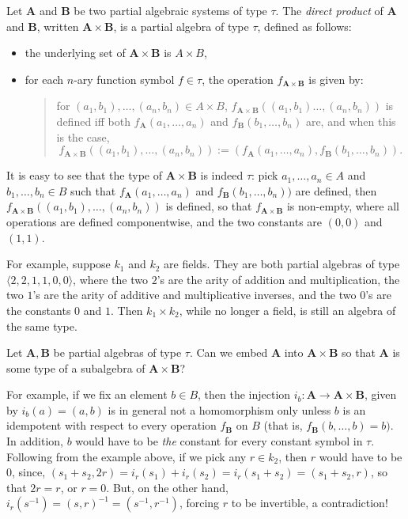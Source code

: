 \documentclass[12pt]{article}
\begin{document}
Let $\boldsymbol{A}$ and $\boldsymbol{B}$ be two partial algebraic systems of type $\tau$.  The \emph{direct product} of $\boldsymbol{A}$ and $\boldsymbol{B}$, written $\boldsymbol{A}\times \boldsymbol{B}$, is a partial algebra of type $\tau$, defined as follows:
\begin{itemize}
\item the underlying set of $\boldsymbol{A}\times \boldsymbol{B}$ is $A\times B$,
\item for each $n$-ary function symbol $f\in \tau$, the operation $f_{\boldsymbol{A}\times \boldsymbol{B}}$ is given by: 
\begin{quote}
for $(a_1,b_1), \ldots, (a_n,b_n) \in A\times B$, $f_{\boldsymbol{A}\times \boldsymbol{B}}((a_1,b_1) \ldots, (a_n,b_n))$  is defined iff both $f_{\boldsymbol{A}}(a_1, \ldots, a_n)$ and $f_{\boldsymbol{B}}(b_1, \ldots,b_n)$ are, and when this is the case,
$$f_{\boldsymbol{A}\times \boldsymbol{B}}((a_1,b_1), \ldots, (a_n,b_n)):=(f_{\boldsymbol{A}}(a_1, \ldots, a_n), f_{\boldsymbol{B}}(b_1, \ldots,b_n)).$$
\end{quote}
\end{itemize}
It is easy to see that the type of $\boldsymbol{A}\times \boldsymbol{B}$ is indeed $\tau$: pick $a_1,\ldots, a_n \in A$ and $b_1,\ldots, b_n \in B$ such that $f_{\boldsymbol{A}}(a_1, \ldots, a_n)$ and $f_{\boldsymbol{B}}(b_1, \ldots,b_n))$ are defined, then $f_{\boldsymbol{A}\times \boldsymbol{B}}((a_1,b_1), \ldots, (a_n,b_n))$ is defined, so that $f_{\boldsymbol{A}\times \boldsymbol{B}}$ is non-empty, where all operations are defined componentwise, and the two constants are $(0,0)$ and $(1,1)$.

For example, suppose $k_1$ and $k_2$ are fields.  They are both partial algebras of type $\langle 2,2,1,1,0,0\rangle$, where the two $2$'s are the arity of addition and multiplication, the two $1$'s are the arity of additive and multiplicative inverses, and the two $0$'s are the constants $0$ and $1$.  Then $k_1\times k_2$, while no longer a field, is still an algebra of the same type. 

Let $\boldsymbol{A},\boldsymbol{B}$ be partial algebras of type $\tau$.  Can we embed $\boldsymbol{A}$ into $\boldsymbol{A}\times \boldsymbol{B}$ so that $\boldsymbol{A}$ is some type of a subalgebra of $\boldsymbol{A}\times \boldsymbol{B}$?

For example, if we fix an element $b\in B$, then the injection $i_b : \boldsymbol{A}\to \boldsymbol{A}\times\boldsymbol{B}$, given by $i_b(a)=(a,b)$ is in general not a homomorphism only unless $b$ is an idempotent with respect to every operation $f_{\boldsymbol{B}}$ on $B$ (that is, $f_{\boldsymbol{B}}(b,\ldots, b)=b)$.  In addition, $b$ would have to be \emph{the} constant for every constant symbol in $\tau$.  Following from the example above, if we pick any $r\in k_2$, then $r$ would have to be $0$, since, $(s_1+s_2,2r)=i_r(s_1)+i_r(s_2)=i_r(s_1+s_2)=(s_1+s_2,r)$, so that $2r=r$, or $r=0$.  But, on the other hand, $i_r(s^{-1})=(s,r)^{-1}=(s^{-1},r^{-1})$, forcing $r$ to be invertible, a contradiction!
\end{document}
